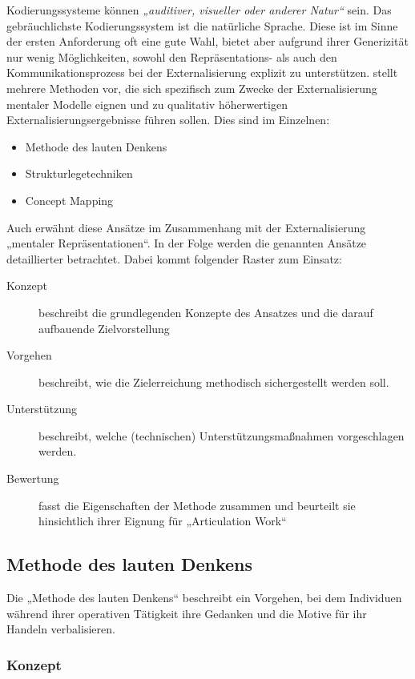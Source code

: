 Kodierungssysteme können \emph{„auditiver, visueller oder anderer Natur“} \citep[][S. 155]{Seel91} sein. Das gebräuchlichste Kodierungssystem ist die natürliche Sprache. Diese ist im Sinne der ersten Anforderung oft eine gute Wahl, bietet aber aufgrund ihrer Generizität nur wenig Möglichkeiten, sowohl den Repräsentations- als auch den Kommunikationsprozess bei der Externalisierung explizit zu unterstützen. \citet{Ifenthaler06} stellt mehrere Methoden vor, die sich spezifisch zum Zwecke der Externalisierung mentaler Modelle eignen und zu qualitativ höherwertigen Externalisierungsergebnisse führen sollen. Dies sind im Einzelnen:
\begin{itemize}
	\item Methode des lauten Denkens
	\item Strukturlegetechniken
	\item Concept Mapping
\end{itemize}

Auch \citep{Huss03} erwähnt diese Ansätze im Zusammenhang mit der Externalisierung „mentaler Repräsentationen“. In der Folge werden die genannten Ansätze detaillierter betrachtet. Dabei kommt folgender Raster zum Einsatz:
\begin{description}
	\item[Konzept] beschreibt die grundlegenden Konzepte des Ansatzes und die darauf aufbauende Zielvorstellung
	\item[Vorgehen] beschreibt, wie die Zielerreichung methodisch sichergestellt werden soll. 
	\item[Unterstützung] beschreibt, welche (technischen) Unterstützungsmaßnahmen vorgeschlagen werden.
	\item[Bewertung] fasst die Eigenschaften der Methode zusammen und beurteilt sie hinsichtlich ihrer Eignung für „Articulation Work“
\end{description}

\subsection{Methode des lauten Denkens} %
\label{sub:methode_des_lauten_denkens}

Die „Methode des lauten Denkens“ \citep{Van-Someren94} beschreibt ein Vorgehen, bei dem Individuen während ihrer operativen Tätigkeit ihre Gedanken und die Motive für ihr Handeln verbalisieren. 

\subsubsection{Konzept}

